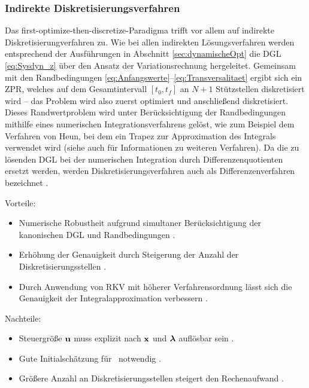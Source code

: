 \subsubsection{Indirekte Diskretisierungsverfahren}\label{subsubsec:Diskretisierungsverfahren_indirekt}
Das \glqq first-optimize-then-discretize\grqq-Paradigma trifft vor allem auf indirekte Diskretisierungverfahren zu. Wie bei allen indirekten Lösungsverfahren werden entsprechend der Ausführungen in Abschnitt \ref{sec:dynamischeOpt} die \gls{DGL} \eqref{eq:Sysdyn_z} über den Ansatz der Variationsrechnung hergeleitet. Gemeinsam mit den Randbedingungen \eqref{eq:Anfangswerte}--\eqref{eq:Transversalitaet} ergibt sich ein \gls{ZPR}, welches auf dem Gesamtintervall $[t_0, t_f]$ an $N+1$ Stützstellen diskretisiert wird \cite{KnutGraichen.2012} -- das Problem wird also zuerst optimiert und anschließend diskretisiert. Dieses Randwertproblem wird unter Berücksichtigung der Randbedingungen mithilfe eines numerischen Integrationsverfahrens gelöst, wie zum Beispiel dem Verfahren von Heun, bei dem ein Trapez zur Approximation des Integrals verwendet wird \cite{KnutGraichen.2012} (siehe auch \cite{Adamy.2009} für Informationen zu weiteren Verfahren). Da die zu lösenden \gls{DGL} bei der numerischen Integration durch Differenzenquotienten ersetzt werden, werden Diskretisierungsverfahren auch als Differenzenverfahren bezeichnet \cite{Ascher.1995c5}.
\begin{multicols}{2}
Vorteile:
	\begin{itemize}
		\item Numerische Robustheit aufgrund simultaner Berücksichtigung der kanonischen \gls{DGL} und Randbedingungen \cite{KnutGraichen.2012}.
		\item Erhöhung der Genauigkeit durch Steigerung der Anzahl der Diskretisierungsstellen \cite{KnutGraichen.2012}.
		\item Durch Anwendung von \gls{RKV} mit höherer Verfahrensordnung lässt sich die Genauigkeit der Integralapproximation verbessern \cite{Ascher.1995c5}.
	\end{itemize}
	
	\columnbreak
	
Nachteile:
	\begin{itemize}
		\item Steuergröße $\boldsymbol{\mathrm{u}}$ muss explizit nach $\boldsymbol{\mathrm{x}}$ und $\boldsymbol{\mathrm{\lambda}}$ auflösbar sein \cite{KnutGraichen.2012}.\vspace{\fill}
		\item Gute Initialschätzung für \lambdaoftzero~notwendig \cite{KnutGraichen.2012}.\vspace{\fill}
		\item Größere Anzahl an Diskretisierungsstellen steigert den Rechenaufwand \cite{KnutGraichen.2012}.\vspace{\fill}
	\end{itemize}
\end{multicols}


